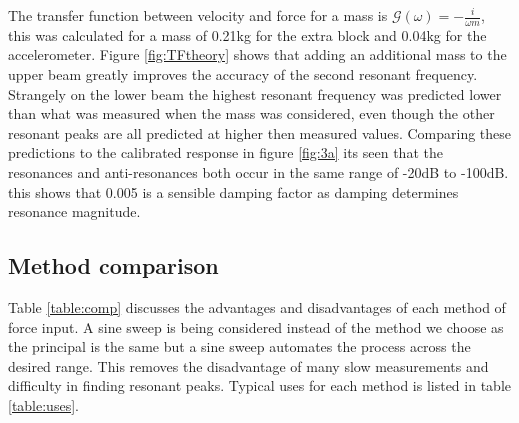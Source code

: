 \documentclass[twoside,onecolumn]{article}
\begin{document}
The transfer function between velocity and force for a mass is $\mathcal{G}(\omega)=-\frac{i}{\omega m}$, this was calculated for a mass of 0.21kg for the extra block and 0.04kg for the accelerometer. Figure \ref{fig:TFtheory} shows that adding an additional mass to the upper beam greatly improves the accuracy of the second resonant frequency. Strangely on the lower beam the highest resonant frequency was predicted lower than what was measured when the mass was considered, even though the other resonant peaks are all predicted at higher then measured values. Comparing these predictions to the calibrated response in figure \ref{fig:3a} its seen that the resonances and anti-resonances both occur in the same range of -20dB to -100dB. this shows that 0.005 is a sensible damping factor as damping determines resonance magnitude.
\subsection{Method comparison}
Table \ref{table:comp} discusses the advantages and disadvantages of each method of force input. A sine sweep is being considered instead of the method we choose as the principal is the same but a sine sweep automates the process across the desired range. This removes the disadvantage of many slow measurements and difficulty in finding resonant peaks. Typical uses for each method is listed in table \ref{table:uses}.
\end{document}
